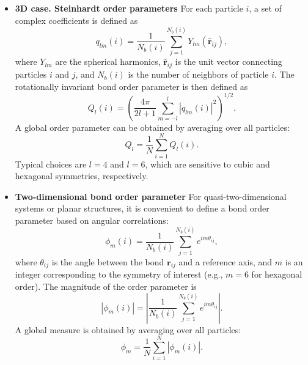 \documentclass[final,1p,times]{elsarticle}
\begin{document}
\begin{itemize}
\item {\bf 3D case. Steinhardt order parameters}
For each particle $i$, a set of complex coefficients is defined as
\begin{equation}
q_{lm}(i) = \frac{1}{N_b(i)} \sum_{j=1}^{N_b(i)}
Y_{lm}(\hat{\mathbf{r}}_{ij}),
\label{ylm}
\end{equation}
where $Y_{lm}$ are the spherical harmonics, $\hat{\mathbf{r}}_{ij}$ is the unit vector connecting particles $i$ and $j$, and $N_b(i)$ is the number of neighbors of particle $i$. The rotationally invariant bond order parameter is then defined as 
\begin{equation}
Q_l(i) = \left( \frac{4\pi}{2l+1}
\sum_{m=-l}^{l} |q_{lm}(i)|^2 \right)^{1/2}.
\end{equation}
A global order parameter can be obtained by averaging over all particles:
\begin{equation}
Q_l = \frac{1}{N} \sum_{i=1}^{N} Q_l(i).
\end{equation}
Typical choices are $l=4$ and $l=6$, which are sensitive to cubic and hexagonal symmetries, respectively.




\item {\bf Two-dimensional bond order parameter}
For quasi-two-dimensional systems or planar structures, it is convenient to define a bond order parameter based on angular correlations\cite{Nelson1979}:
\begin{equation}
\phi_m(i) = \frac{1}{N_b(i)} \sum_{j=1}^{N_b(i)}
e^{i m \theta_{ij}},
\end{equation}
where $\theta_{ij}$ is the angle between the bond $\mathbf{r}_{ij}$ and a reference axis, and $m$ is an integer corresponding to the symmetry of interest (e.g., $m=6$ for hexagonal order). The magnitude of the order parameter is
\begin{equation}
|\phi_m(i)| = \left| \frac{1}{N_b(i)} \sum_{j=1}^{N_b(i)}
e^{i m \theta_{ij}} \right|.
\label{cossin}
\end{equation}
A global measure is obtained by averaging over all particles:
\begin{equation}
\phi_m = \frac{1}{N} \sum_{i=1}^{N} |\phi_m(i)|.
\end{equation}


\end{itemize}
\end{document}
